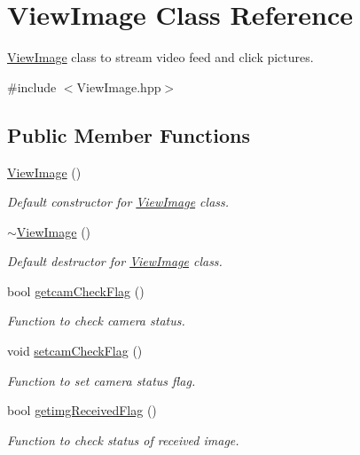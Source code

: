 \hypertarget{classViewImage}{}\section{View\+Image Class Reference}
\label{classViewImage}


\hyperlink{classViewImage}{View\+Image} class to stream video feed and click pictures.  




{\ttfamily \#include $<$View\+Image.\+hpp$>$}

\subsection*{Public Member Functions}
\begin{DoxyCompactItemize}
\item 
\hyperlink{classViewImage_adf6ffef464f5d2047ddf1e061e8ab9e7}{View\+Image} ()
\begin{DoxyCompactList}\small\item\em Default constructor for \hyperlink{classViewImage}{View\+Image} class. \end{DoxyCompactList}\item 
\hyperlink{classViewImage_a754fe59872a1736005cdbb816baf80ce}{$\sim$\+View\+Image} ()
\begin{DoxyCompactList}\small\item\em Default destructor for \hyperlink{classViewImage}{View\+Image} class. \end{DoxyCompactList}\item 
bool \hyperlink{classViewImage_aa598e832e3edf78bfe9fa2ffff922bd7}{getcam\+Check\+Flag} ()
\begin{DoxyCompactList}\small\item\em Function to check camera status. \end{DoxyCompactList}\item 
void \hyperlink{classViewImage_abaabe650dbbe820aedfd43993a30ede7}{setcam\+Check\+Flag} ()
\begin{DoxyCompactList}\small\item\em Function to set camera status flag. \end{DoxyCompactList}\item 
bool \hyperlink{classViewImage_a6cff5068af16e2fc3527f75cc29af79e}{getimg\+Received\+Flag} ()
\begin{DoxyCompactList}\small\item\em Function to check status of received image. \end{DoxyCompactList}\item 

\end{DoxyCompactItemize}
